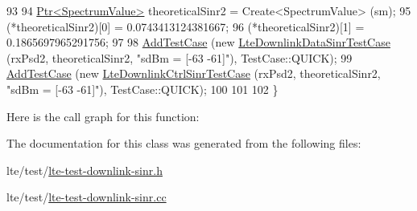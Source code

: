 \begin{DoxyCode}
93 
94   \hyperlink{classns3_1_1Ptr}{Ptr<SpectrumValue>} theoreticalSinr2 = Create<SpectrumValue> (sm);
95   (*theoreticalSinr2)[0] = 0.0743413124381667;
96   (*theoreticalSinr2)[1] = 0.1865697965291756;
97 
98   \hyperlink{classns3_1_1TestCase_a3718088e3eefd5d6454569d2e0ddd835}{AddTestCase} (\textcolor{keyword}{new} \hyperlink{classLteDownlinkDataSinrTestCase}{LteDownlinkDataSinrTestCase} (rxPsd2, 
      theoreticalSinr2, \textcolor{stringliteral}{"sdBm = [-63 -61]"}), TestCase::QUICK);
99   \hyperlink{classns3_1_1TestCase_a3718088e3eefd5d6454569d2e0ddd835}{AddTestCase} (\textcolor{keyword}{new} \hyperlink{classLteDownlinkCtrlSinrTestCase}{LteDownlinkCtrlSinrTestCase} (rxPsd2, 
      theoreticalSinr2, \textcolor{stringliteral}{"sdBm = [-63 -61]"}), TestCase::QUICK);
100   
101 
102 \}
\end{DoxyCode}


Here is the call graph for this function\+:




The documentation for this class was generated from the following files\+:\begin{DoxyCompactItemize}
\item 
lte/test/\hyperlink{lte-test-downlink-sinr_8h}{lte-\/test-\/downlink-\/sinr.\+h}\item 
lte/test/\hyperlink{lte-test-downlink-sinr_8cc}{lte-\/test-\/downlink-\/sinr.\+cc}\end{DoxyCompactItemize}
